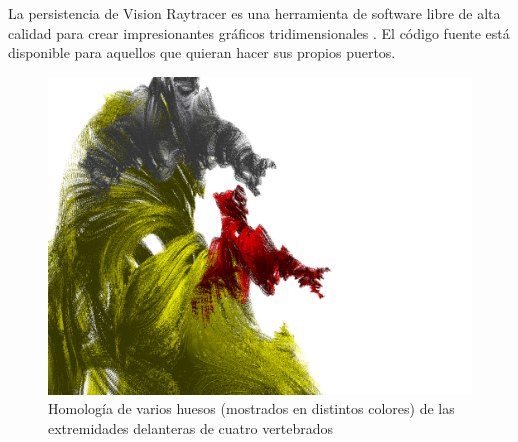 \documentclass[
  11pt,
]{krantz}
\theoremstyle{definition}
\theoremstyle{definition}
\theoremstyle{definition}
\theoremstyle{definition}
\theoremstyle{remark}
\begin{document}
La persistencia de Vision Raytracer es una herramienta de software libre de alta calidad para crear impresionantes gráficos tridimensionales . El código fuente está disponible para aquellos que quieran hacer sus propios puertos.

\begin{figure}[!ht]

{\centering \includegraphics[width=1\linewidth]{povray} 

}

\caption{Homología de varios huesos (mostrados en distintos colores) de las extremidades delanteras de cuatro vertebrados}\label{fig:ray}
\end{figure}
\end{document}
